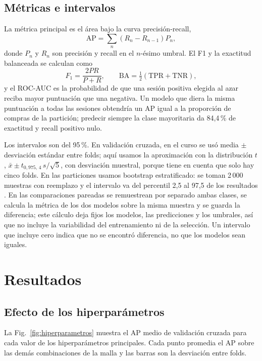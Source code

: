 \documentclass[journal]{IEEEtran}
\begin{document}
\subsection{Métricas e intervalos}

La métrica principal es el área bajo la curva precisión-recall,
\begin{equation}
\mathrm{AP}=\sum_{n}\left(R_n-R_{n-1}\right)P_n,
\end{equation}
donde $P_n$ y $R_n$ son precisión y recall en el $n$-ésimo umbral. El F1 y la exactitud
balanceada se calculan como
\begin{equation}
F_1=\frac{2PR}{P+R},\qquad \mathrm{BA}=\tfrac{1}{2}\left(\mathrm{TPR}+\mathrm{TNR}\right),
\end{equation}
y el ROC-AUC es la probabilidad de que una sesión positiva elegida al azar reciba mayor
puntuación que una negativa. Un modelo que diera la misma puntuación a todas las sesiones obtendría un AP igual a la
proporción de compras de la partición; predecir siempre la clase mayoritaria da 84,4\,\% de exactitud y recall
positivo nulo.

Los intervalos son del 95\,\%. En validación cruzada, en el curso se usó media $\pm$ desviación
estándar entre folds; aquí usamos la aproximación con la distribución $t$,
$\bar{x}\pm t_{0{,}975,\,4}\,s/\sqrt{5}$, con desviación muestral, porque tiene en cuenta que
solo hay cinco folds. En las particiones usamos bootstrap estratificado: se toman 2\,000
muestras con reemplazo y el intervalo va del percentil 2{,}5 al 97{,}5 de los resultados
\cite{ref_efron}. En las comparaciones pareadas se remuestrean por separado ambas clases,
se calcula la métrica de los dos modelos sobre la misma muestra y se guarda la diferencia;
este cálculo deja fijos los modelos, las predicciones y los umbrales, así que no
incluye la variabilidad del entrenamiento ni de la selección. Un intervalo que incluye cero
indica que no se encontró diferencia, no que los modelos sean iguales.

\section{Resultados}
\label{sec:resultados}

\subsection{Efecto de los hiperparámetros}

La Fig.~\ref{fig:hiperparametros} muestra el AP medio de validación cruzada para cada
valor de los hiperparámetros principales. Cada punto promedia el AP sobre las demás
combinaciones de la malla y las barras son la desviación entre folds.
\end{document}
